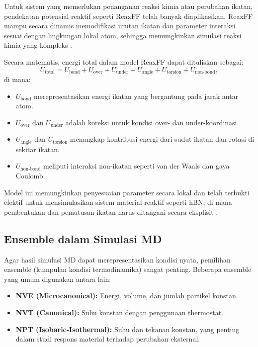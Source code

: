 Untuk sistem yang memerlukan penanganan reaksi kimia atau perubahan ikatan, pendekatan potensial reaktif seperti ReaxFF telah banyak diaplikasikan. ReaxFF mampu secara dinamis memodifikasi urutan ikatan dan parameter interaksi sesuai dengan lingkungan lokal atom, sehingga memungkinkan simulasi reaksi kimia yang kompleks \citep{wang_predicting_2018}.
 
Secara matematis, energi total dalam model ReaxFF dapat dituliskan sebagai:
\begin{equation}
    U_{\text{total}} = U_{\text{bond}} + U_{\text{over}} + U_{\text{under}} + U_{\text{angle}} + U_{\text{torsion}} + U_{\text{non-bond}},
\end{equation}
di mana:
\begin{itemize}
    \item \( U_{\text{bond}} \) merepresentasikan energi ikatan yang bergantung pada jarak antar atom.
    \item \( U_{\text{over}} \) dan \( U_{\text{under}} \) adalah koreksi untuk kondisi over- dan under-koordinasi.
    \item \( U_{\text{angle}} \) dan \( U_{\text{torsion}} \) menangkap kontribusi energi dari sudut ikatan dan rotasi di sekitar ikatan.
    \item \( U_{\text{non-bond}} \) meliputi interaksi non-ikatan seperti van der Waals dan gaya Coulomb.
\end{itemize}
Model ini memungkinkan penyesuaian parameter secara lokal dan telah terbukti efektif untuk mensimulasikan sistem material reaktif seperti hBN, di mana pembentukan dan pemutusan ikatan harus ditangani secara eksplisit \citep{wang_predicting_2018}.

\subsection{Ensemble dalam Simulasi MD}
Agar hasil simulasi MD dapat merepresentasikan kondisi nyata, pemilihan ensemble (kumpulan kondisi termodinamika) sangat penting. Beberapa ensemble yang umum digunakan antara lain:
\begin{itemize}
    \item \textbf{NVE (Microcanonical):} Energi, volume, dan jumlah partikel konstan.
    \item \textbf{NVT (Canonical):} Suhu konstan dengan penggunaan thermostat.
    \item \textbf{NPT (Isobaric-Isothermal):} Suhu dan tekanan konstan, yang penting dalam studi respons material terhadap perubahan eksternal.
\end{itemize}

